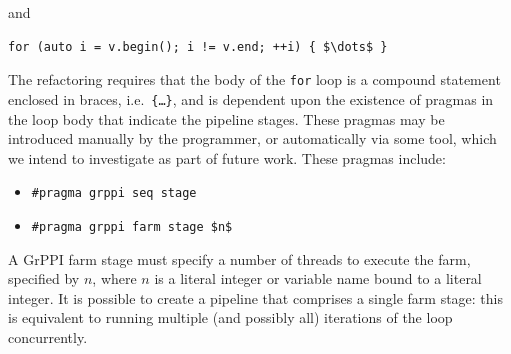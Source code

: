 \noindent
and
\begin{lstlisting}[mathescape]
for (auto i = v.begin(); i != v.end; ++i) { $\dots$ }
\end{lstlisting}


\noindent
The refactoring requires that the body of the \texttt{for} loop is a compound statement enclosed in braces, i.e.\ \texttt{\{\dots\}}, and is dependent upon the existence of pragmas in the loop body that indicate the pipeline stages. These pragmas may be introduced manually by the programmer, or automatically via some tool, which we intend to investigate as part of future work.
These pragmas include:
% 
\begin{itemize}
\item
  \lstinline|#pragma grppi seq stage|
\item
  \lstinline[mathescape]|#pragma grppi farm stage $n$|
\end{itemize}

\noindent
A GrPPI farm stage must specify a number of threads to execute the farm, specified by
$n$, where $n$ is a literal integer or variable name bound to a literal integer.
%
It is possible to create a pipeline that comprises a single
farm stage: this is equivalent to running multiple (and possibly all)
iterations of the loop concurrently.




